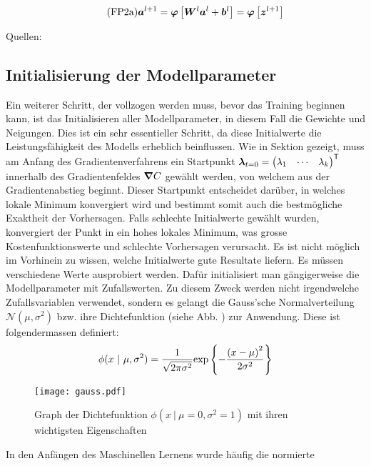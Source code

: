 \begin{equation}\tag{FP2a}\label{eq:aktivierung_matrix}
  \bm{a}^{l+1} = \bm{\varphi} \left[\bm{W}^{l} \bm{a}^{l} + \bm{b}^{l} \right] = \bm{\varphi} \left[ \bm{z}^{l+1} \right]
\end{equation}

\para{}
Quellen: \cite{Nielsen}

\subsection{Initialisierung der Modellparameter}\label{sec:parameter_initalisieren}
Ein weiterer Schritt, der vollzogen werden muss, bevor das Training beginnen kann, ist das
Initialisieren aller Modellparameter, in diesem Fall die Gewichte und Neigungen.
Dies ist ein sehr essentieller Schritt, da diese Initialwerte die
Leistungsfähigkeit des Modells erheblich beinflussen.
\para{}
Wie in Sektion  gezeigt, muss am Anfang des
Gradientenverfahrens ein Startpunkt $\bm{\lambda}_{t=0} = \begin{pmatrix}
    \lambda_1 & \cdots & \lambda_k \end{pmatrix}^{\mathsf{T}}$ innerhalb des Gradientenfeldes
$\bm{\nabla}C$ gewählt werden, von welchem aus der Gradientenabstieg beginnt.
Dieser Startpunkt entscheidet darüber, in welches lokale Minimum konvergiert
wird und bestimmt somit auch die bestmögliche Exaktheit der Vorhersagen. Falls
schlechte Initialwerte gewählt wurden, konvergiert der Punkt in ein hohes lokales
Minimum, was grosse Kostenfunktionswerte und schlechte Vorhersagen verursacht.
\para{}
Es ist nicht möglich im Vorhinein zu wissen, welche Initialwerte gute Resultate
liefern. Es müssen verschiedene Werte ausprobiert werden. Dafür initialisiert man gängigerweise die
Modellparameter mit Zufallswerten. Zu diesem Zweck werden nicht irgendwelche
Zufallsvariablen verwendet, sondern es gelangt die Gauss'sche Normalverteilung
$\mathcal{N}(\mu,\sigma^2)$ bzw. ihre Dichtefunktion (siehe Abb. ) zur Anwendung. Diese ist
folgendermassen definiert:
\[\ds \phi(x\ |\ \mu,\sigma^2) = \frac{1}{\sqrt{2\pi\sigma^2}} \text{exp} \left\{-\frac{{(x-\mu)}^2}{2\sigma^2}\right\} \]
\para{}
\begin{figure}[h!]
  \centering
  \texttt{[image: gauss.pdf]}
  \caption{Graph der Dichtefunktion $\phi(x\ |\ \mu=0,\sigma^2=1)$ mit ihren
    wichtigsten Eigenschaften}%
  \label{fig:normalverteilung}
\end{figure}
In den Anfängen des Maschinellen Lernens wurde häufig die normierte
